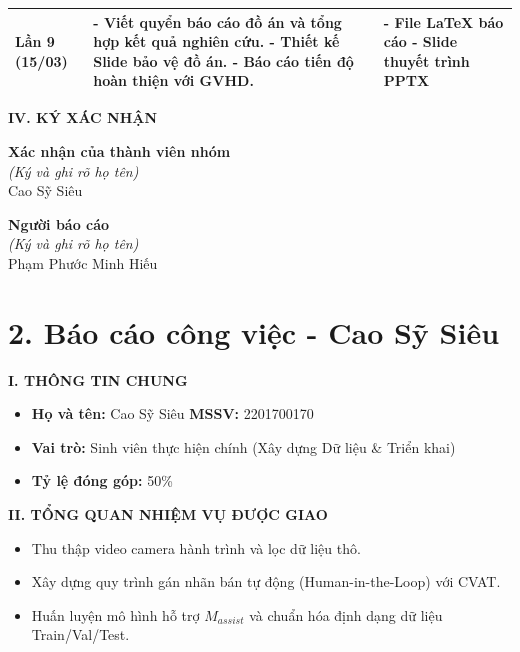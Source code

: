 \begin{center}
\begin{longtable}{|>{\centering\arraybackslash}p{2.5cm}|p{6.5cm}|p{5cm}|}
		Lần 9 \newline (15/03)  & 
		- Viết quyển báo cáo đồ án và tổng hợp kết quả nghiên cứu. \newline
		- Thiết kế Slide bảo vệ đồ án. \newline
		- Báo cáo tiến độ hoàn thiện với GVHD. & 
		- File LaTeX báo cáo \newline
		- Slide thuyết trình PPTX \\
		\hline
	\end{longtable}
\end{center}
\pagebreak
\textbf{IV. KÝ XÁC NHẬN}
\vspace{0.5cm}

\noindent
\begin{minipage}{0.5\textwidth}
	\centering
	\textbf{Xác nhận của thành viên nhóm} \\
	\textit{(Ký và ghi rõ họ tên)} \\
	\vspace{2cm}
	Cao Sỹ Siêu
\end{minipage}%
\begin{minipage}{0.5\textwidth}
	\centering
	\textbf{Người báo cáo} \\
	\textit{(Ký và ghi rõ họ tên)} \\
	\vspace{2cm}
	Phạm Phước Minh Hiếu
\end{minipage}

\newpage
\section*{2. Báo cáo công việc - Cao Sỹ Siêu}

\textbf{I. THÔNG TIN CHUNG}
\begin{itemize}
	\item \textbf{Họ và tên:} Cao Sỹ Siêu \hspace{1cm} \textbf{MSSV:} 2201700170
	\item \textbf{Vai trò:} Sinh viên thực hiện chính (Xây dựng Dữ liệu \& Triển khai)
	\item \textbf{Tỷ lệ đóng góp:} 50\%
\end{itemize}

\textbf{II. TỔNG QUAN NHIỆM VỤ ĐƯỢC GIAO}
\begin{itemize}
	\item Thu thập video camera hành trình và lọc dữ liệu thô.
	\item Xây dựng quy trình gán nhãn bán tự động (Human-in-the-Loop) với CVAT.
	\item Huấn luyện mô hình hỗ trợ $M_{assist}$ và chuẩn hóa định dạng dữ liệu Train/Val/Test.
\end{itemize}

